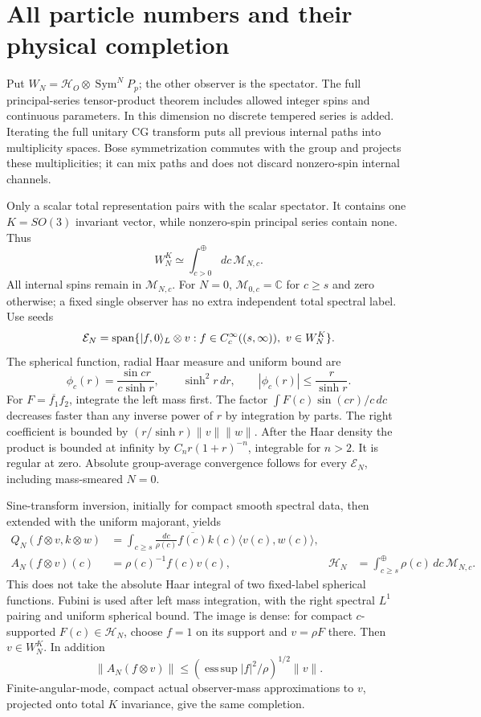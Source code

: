 \documentclass[11pt,a4paper]{article}
\newcommand{\HH}{\mathcal H}\newcommand{\MM}{\mathcal M}
\begin{document}
\newpage
\section{All particle numbers and their physical completion}
Put $W_N=\HH_O\otimes\operatorname{Sym}^N P_p$; the other observer is
the spectator. The full principal-series tensor-product theorem
\cite{ds,my} includes allowed integer spins and continuous parameters.
In this dimension no discrete tempered series is added.
Iterating the full unitary CG transform puts all previous internal
paths into multiplicity spaces. Bose symmetrization commutes with
the group and projects these multiplicities; it can mix paths and
does not discard nonzero-spin internal channels.

Only a scalar total representation pairs with the scalar spectator.
It contains one $K=SO(3)$ invariant vector, while nonzero-spin
principal series contain none. Thus
\begin{equation}
 W_N^K\simeq\int_{c>0}^{\oplus}dc\,\MM_{N,c}.
 \label{WN}
\end{equation}
All internal spins remain in $\MM_{N,c}$.
For $N=0$, $\MM_{0,c}=\mathbb C$ for $c\ge s$ and zero otherwise;
a fixed single observer has no extra independent total spectral label.
Use seeds
\[
 {\cal E}_N=\operatorname{span}\{|f,0\rangle_L\otimes v:
       f\in C_c^\infty((s,\infty)),\ v\in W_N^K\}.
\]
The spherical function, radial Haar measure and uniform bound are
\[
 \phi_c(r)=\frac{\sin cr}{c\sinh r},\qquad
 \sinh^2r\,dr,\qquad |\phi_c(r)|\le\frac r{\sinh r}.
\]
For $F=\overline{f_1}f_2$, integrate the left mass first.
The factor $\int F(c)\sin(cr)/c\,dc$ decreases faster than any
inverse power of $r$ by integration by parts.
The right coefficient is bounded by $(r/\sinh r)\|v\|\|w\|$.
After the Haar density the product is bounded at infinity by
$C_n r(1+r)^{-n}$, integrable for $n>2$.
It is regular at zero. Absolute group-average convergence follows
for every $\mathcal E_N$, including mass-smeared $N=0$.

Sine-transform inversion, initially for compact smooth spectral data,
then extended with the uniform majorant, yields
\begin{align}
 Q_N(f\otimes v,k\otimes w)
 &=\int_{c\ge s}\frac{dc}{\rho(c)}
      \overline{f(c)}k(c)\langle v(c),w(c)\rangle,\nonumber\\
 A_N(f\otimes v)(c)&=\rho(c)^{-1}f(c)v(c),&
 \HH_N&=\int_{c\ge s}^{\oplus}\rho(c)\,dc\,\MM_{N,c}.
 \label{GA}
\end{align}
This does not take the absolute Haar integral of two fixed-label
spherical functions. Fubini is used after left mass integration,
with the right spectral $L^1$ pairing and uniform spherical bound.
The image is dense: for compact $c$-supported $F(c)\in\HH_N$,
choose $f=1$ on its support and $v=\rho F$ there. Then $v\in W_N^K$.
In addition
\[
 \|A_N(f\otimes v)\|\le
 \left(\operatorname*{ess\,sup}|f|^2/\rho\right)^{1/2}\|v\|.
\]
Finite-angular-mode, compact actual observer-mass approximations
to $v$, projected onto total $K$ invariance, give the same completion.
\end{document}
